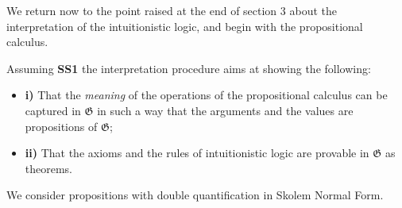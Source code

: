 \documentclass[12pt]{article}
\begin{document}
We return now to the point raised at the end of section 3 about the interpretation of the intuitionistic logic, and begin with the propositional calculus.

Assuming \textbf{SS1} the interpretation procedure aims at showing the following:

\begin{itemize}
\item \textbf{i)} That the \emph{meaning} of the operations of the propositional calculus can be captured in $\mathfrak{G}$ in such a way that the arguments and the values are propositions of $\mathfrak{G}$;

\item \textbf{ii)} That the axioms and the rules of intuitionistic logic are provable in $\mathfrak{G}$ as theorems.
\end{itemize}

We consider propositions with double quantification in Skolem Normal Form.
\end{document}
